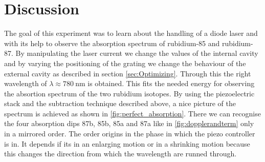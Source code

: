 \section{Discussion}
\label{sec:Diskussion}

The goal of this experiment was to learn about the handling of a diode laser and with its help to observe the absorption spectrum of rubidium-85 and rubidium-87.
By manipulating the laser current we change the values of the internal cavity and by varying the positioning of the grating we change the behaviour of the external cavity as described in section \ref{sec:Optimizing}. Through this the right wavelength of $\lambda \approx \SI{780}{\nano\meter}$ is obtained. This fits the needed energy for observing the absortion spectrum of the two rubidium isotopes. By using the piezoelectric stack and the subtraction technique described above, a nice picture of the spectrum is achieved as shown in \ref{fig:perfect_absorption}. There we can recognise the four absorption dips 87b, 85b, 85a and 87a like in \ref{fig:dopplerandterm} only in a mirrored order. The order origins in the phase in which the piezo controller is in. It depends if its in an enlarging motion or in a shrinking motion because this changes the direction from which the wavelength are runned through.
